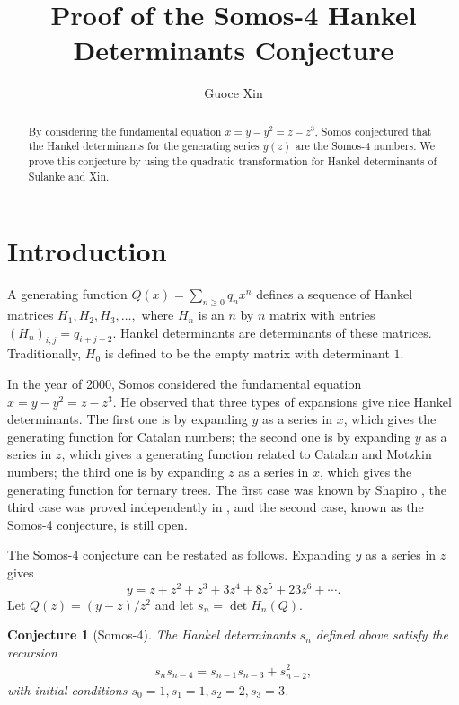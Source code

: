 \documentclass{fpsac}
\title{Proof of the Somos-4 Hankel Determinants Conjecture}
\author[G. Xin]{Guoce Xin}
\newtheorem{conj}[theorem]{Conjecture}
\begin{document}
\begin{abstract}
By considering the fundamental equation $x=y-y^2=z-z^3$, Somos
conjectured that the Hankel determinants for the generating series
$y(z)$ are the Somos-4 numbers. We prove this conjecture by using
the quadratic transformation for Hankel determinants of Sulanke and
Xin.
\end{abstract}

\maketitle  

\section{Introduction}

A generating function $Q(x)=\sum_{n\ge 0} q_n x^n$ defines a
sequence of Hankel matrices $H_1,H_2,H_3,\dots, $ where $H_n$ is an
$n$ by $n$ matrix with entries $(H_n)_{i,j}=q_{i+j-2}$. Hankel
determinants are determinants of these matrices. Traditionally,
$H_0$ is defined to be the empty matrix with determinant $1$.

In the year of 2000, Somos \cite{Somos} considered the fundamental
equation $x=y-y^2=z-z^3$. He observed that three types of expansions
give nice Hankel determinants. The first one is by expanding $y$ as
a series in $x$, which gives the generating function for Catalan
numbers; the second one is by expanding $y$ as a series in $z$,
which gives a generating function related to Catalan and Motzkin
numbers; the third one is by expanding $z$ as a series in $x$, which
gives the generating function for ternary trees. The first case was
known by Shapiro \cite{Shapiro}, the third case was proved
independently in \cite{err,xingessel2,tamm}, and the second case,
known as the {{{Somos-4 conjecture}}}, is still open.

The Somos-4 conjecture can be restated as follows. Expanding $y$ as
a series in $z$ gives
$$y=z+z^2+z^3+3z^4+8z^5+23z^6 +\cdots.$$
Let $Q(z)=(y-z)/z^2$ and let $s_n=\det H_n(Q)$.

\begin{conj}[Somos-4]
The Hankel determinants $s_n$ defined above satisfy the recursion
\begin{align} s_ns_{n-4}=s_{n-1}s_{n-3}+s_{n-2}^2, \label{e-rec-s}
\end{align} with
initial conditions $s_0=1,s_1=1,s_2=2,s_3=3$.
\end{conj}
\end{document}
